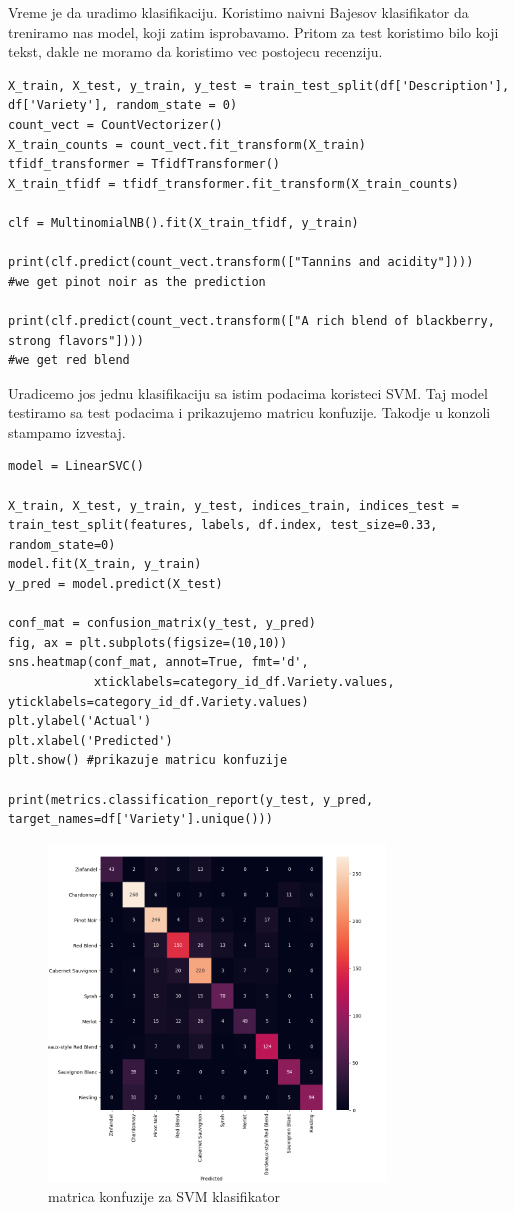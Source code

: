 \documentclass[11pt]{article} %
\begin{document}
Vreme je da uradimo klasifikaciju. Koristimo naivni Bajesov klasifikator da treniramo nas model, koji zatim isprobavamo. Pritom za test koristimo 
bilo koji tekst, dakle ne moramo da koristimo vec postojecu recenziju. 
\begin{lstlisting}
X_train, X_test, y_train, y_test = train_test_split(df['Description'], df['Variety'], random_state = 0)
count_vect = CountVectorizer()
X_train_counts = count_vect.fit_transform(X_train)
tfidf_transformer = TfidfTransformer()
X_train_tfidf = tfidf_transformer.fit_transform(X_train_counts)

clf = MultinomialNB().fit(X_train_tfidf, y_train)

print(clf.predict(count_vect.transform(["Tannins and acidity"])))
#we get pinot noir as the prediction

print(clf.predict(count_vect.transform(["A rich blend of blackberry, strong flavors"])))
#we get red blend 
\end{lstlisting}
Uradicemo jos jednu klasifikaciju sa istim podacima koristeci SVM. Taj model testiramo 
sa test podacima i prikazujemo matricu konfuzije. Takodje u konzoli stampamo izvestaj.
\begin{lstlisting}
model = LinearSVC()

X_train, X_test, y_train, y_test, indices_train, indices_test = train_test_split(features, labels, df.index, test_size=0.33, random_state=0)
model.fit(X_train, y_train)
y_pred = model.predict(X_test)

conf_mat = confusion_matrix(y_test, y_pred)
fig, ax = plt.subplots(figsize=(10,10))
sns.heatmap(conf_mat, annot=True, fmt='d',
            xticklabels=category_id_df.Variety.values, yticklabels=category_id_df.Variety.values)
plt.ylabel('Actual')
plt.xlabel('Predicted')
plt.show() #prikazuje matricu konfuzije

print(metrics.classification_report(y_test, y_pred, target_names=df['Variety'].unique()))
\end{lstlisting}
\begin{figure}[h!]
	\centering
		\includegraphics[width=0.8\textwidth]{conf_matrix_SVM}
		\caption{matrica konfuzije za SVM klasifikator}
	\end{figure}
\end{document}
